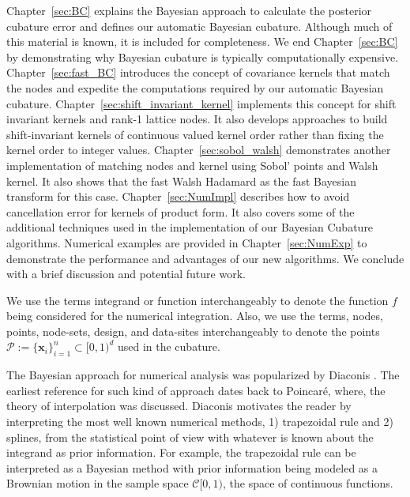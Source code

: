 \documentclass{iitthesis}          %
\newcommand{\bm}[1]{\boldsymbol{#1}}
\newcommand{\vx}{\bm{x}}
\newcommand{\JRNote}[1]{}
\begin{document}
Chapter~\ref{sec:BC} explains the Bayesian approach to calculate the posterior cubature error and defines our automatic Bayesian cubature. Although much of this material is known, it is included for completeness.  We end Chapter~\ref{sec:BC}  by demonstrating why Bayesian cubature is typically computationally expensive.
Chapter~\ref{sec:fast_BC}  introduces the concept of covariance kernels that match the nodes and expedite the computations required by our automatic Bayesian cubature. 
Chapter~\ref{sec:shift_invariant_kernel} implements this concept for shift invariant kernels and rank-1 lattice nodes. It also develops approaches to build shift-invariant kernels of continuous valued kernel order rather than fixing the kernel order to integer values.
Chapter~\ref{sec:sobol_walsh} demonstrates another implementation of matching nodes and kernel using Sobol' points and Walsh kernel. It also shows that the fast Walsh Hadamard as the fast Bayesian transform for this case.
Chapter~\ref{sec:NumImpl} describes how to avoid cancellation error for kernels of product form. 
It also covers  some of the additional techniques used in the implementation of our Bayesian Cubature algorithms. 
Numerical examples are provided in Chapter~\ref{sec:NumExp} to demonstrate the performance and advantages of our new algorithms.  We conclude with a brief discussion and potential future work.


We use the terms integrand or function interchangeably to denote the function $f$ being considered for the numerical integration. Also, we use the terms, nodes, points, node-sets, design, and data-sites interchangeably to denote the points $\mathcal{P} := \{\vx_i\}_{i=1}^n \subset [0,1)^d$ used in the cubature.













\label{sec:BC} 


The Bayesian approach for numerical analysis was popularized by Diaconis \cite{Dia88a}. The earliest reference for such kind of approach dates back to Poincar\'e, where, the theory of interpolation was discussed.
Diaconis motivates the reader by interpreting the most well known numerical methods, 1) trapezoidal rule and 2) splines, from the statistical point of view with whatever is known about the integrand as prior information. 
For example, the trapezoidal rule can be interpreted as a Bayesian method with prior information being modeled as a Brownian motion in the sample space $\mathcal{C}[0,1)$, the space of continuous functions. %
\end{document}
